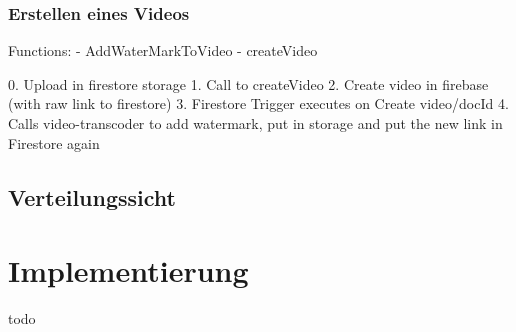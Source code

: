 \subsubsection{Erstellen eines Videos}

Functions:
- AddWaterMarkToVideo
- createVideo

0. Upload in firestore storage
1. Call to createVideo
2. Create video in firebase (with raw link to firestore)
3. Firestore Trigger executes on Create video/{docId}
4. Calls video-transcoder to add watermark, put in storage and put the new link in Firestore again


\subsection{Verteilungssicht}

\section{Implementierung}

todo